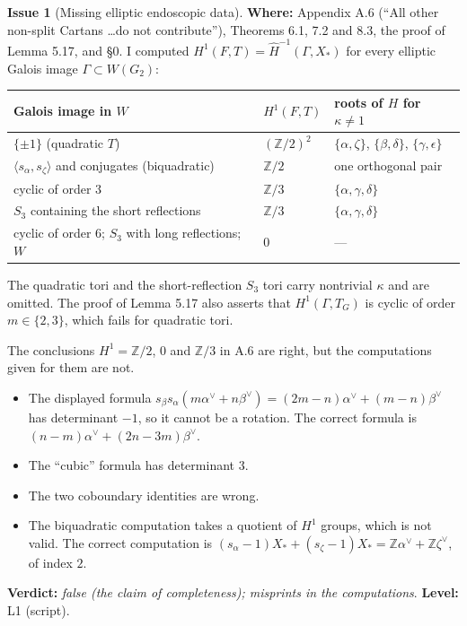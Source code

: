 \documentclass[12pt,letterpaper]{article}
\newcommand{\Lv}[1]{\textsf{L#1}}
\newcommand{\verdict}[1]{\textbf{Verdict:} \emph{#1}.}
\newcommand{\level}[1]{\textbf{Level:} #1.}
\newcommand{\loc}[1]{\textbf{Where:} #1.}
\theoremstyle{definition}
\newtheorem{issue}{Issue}[section]
\begin{document}
\begin{issue}[Missing elliptic endoscopic data]\label{iss:tori}
\loc{Appendix A.6 (``All other non-split Cartans \dots do not contribute''),
Theorems 6.1, 7.2 and 8.3, the proof of Lemma 5.17, and \S0}
I computed $H^1(F,T)=\hat H^{-1}(\Gamma,X_*)$ for every elliptic Galois image
$\Gamma\subset W(G_2)$:

\smallskip
\begin{center}
\begin{tabular}{lll}
\toprule
Galois image in $W$ & $H^1(F,T)$ & roots of $H$ for $\kappa\neq1$\\
\midrule
$\{\pm1\}$ (quadratic $T$) & $(\mathbb Z/2)^2$ & $\{\alpha,\zeta\}$, $\{\beta,\delta\}$, $\{\gamma,\epsilon\}$\\
$\langle s_\alpha,s_\zeta\rangle$ and conjugates (biquadratic) & $\mathbb Z/2$ & one orthogonal pair\\
cyclic of order $3$ & $\mathbb Z/3$ & $\{\alpha,\gamma,\delta\}$\\
$S_3$ containing the short reflections & $\mathbb Z/3$ & $\{\alpha,\gamma,\delta\}$\\
cyclic of order $6$; $S_3$ with long reflections; $W$ & $0$ & --- \\
\bottomrule
\end{tabular}
\end{center}
\smallskip

The quadratic tori and the short-reflection $S_3$ tori carry nontrivial
$\kappa$ and are omitted. The proof of Lemma 5.17 also asserts that
$H^1(\Gamma,T_G)$ is cyclic of order $m\in\{2,3\}$, which fails for quadratic
tori.

The conclusions $H^1=\mathbb Z/2$, $0$ and $\mathbb Z/3$ in A.6 are right, but
the computations given for them are not.
\begin{itemize}
\item The displayed formula
$s_\beta s_\alpha(m\alpha^\vee+n\beta^\vee)=(2m-n)\alpha^\vee+(m-n)\beta^\vee$
has determinant $-1$, so it cannot be a rotation. The correct formula is
$(n-m)\alpha^\vee+(2n-3m)\beta^\vee$.
\item The ``cubic'' formula has determinant $3$.
\item The two coboundary identities are wrong.
\item The biquadratic computation takes a quotient of $H^1$ groups, which is
not valid. The correct computation is $(s_\alpha-1)X_*+(s_\zeta-1)X_*=\mathbb Z\alpha^\vee+\mathbb Z\zeta^\vee$, of index $2$.
\end{itemize}

\verdict{false (the claim of completeness); misprints in the computations}
\level{\Lv{1} (script)}
\end{issue}
\end{document}
